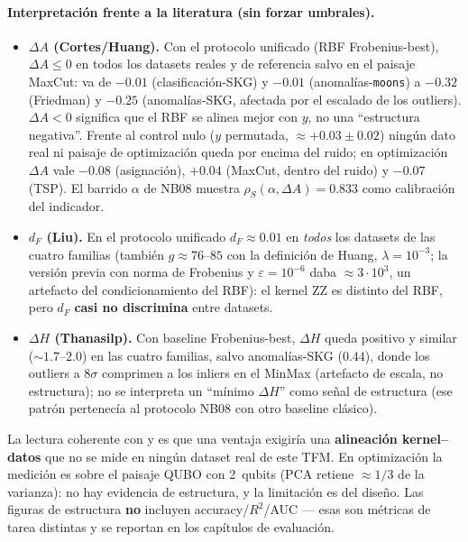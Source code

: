 \paragraph{Interpretación frente a la literatura (sin forzar umbrales).}
\begin{itemize}
    \item \textbf{$\Delta A$ (Cortes/Huang).} Con el protocolo unificado (RBF Frobenius-best), $\Delta A\le 0$ en todos los datasets reales y de referencia salvo en el paisaje MaxCut: va de $-0.01$ (clasificación-SKG) y $-0.01$ (anomalías-\texttt{moons}) a $-0.32$ (Friedman) y $-0.25$ (anomalías-SKG, afectada por el escalado de los outliers). $\Delta A<0$ significa que el RBF se alinea mejor con $y$, no una ``estructura negativa''. Frente al control nulo ($y$ permutada, $\approx+0.03\pm0.02$) ningún dato real ni paisaje de optimización queda por encima del ruido; en optimización $\Delta A$ vale $-0.08$ (asignación), $+0.04$ (MaxCut, dentro del ruido) y $-0.07$ (TSP). El barrido $\alpha$ de NB08 muestra $\rho_S(\alpha,\Delta A)=0.833$ como calibración del indicador.
    \item \textbf{$d_F$ (Liu).} En el protocolo unificado $d_F\approx 0.01$ en \emph{todos} los datasets de las cuatro familias (también $g\approx 76$--$85$ con la definición de Huang, $\lambda=10^{-3}$; la versión previa con norma de Frobenius y $\varepsilon=10^{-6}$ daba $\approx 3\cdot10^{3}$, un artefacto del condicionamiento del RBF): el kernel ZZ es distinto del RBF, pero $d_F$ \textbf{casi no discrimina} entre datasets.
    \item \textbf{$\Delta H$ (Thanasilp).} Con baseline Frobenius-best, $\Delta H$ queda positivo y similar ($\sim 1.7$--$2.0$) en las cuatro familias, salvo anomalías-SKG ($0.44$), donde los outliers a $8\sigma$ comprimen a los inliers en el MinMax (artefacto de escala, no estructura); no se interpreta un ``mínimo $\Delta H$'' como señal de estructura (ese patrón pertenecía al protocolo NB08 con otro baseline clásico).
\end{itemize}
La lectura coherente con \citet{liu2021} y \citet{huang2021} es que una ventaja exigiría una \textbf{alineación kernel--datos} que no se mide en ningún dataset real de este TFM. En optimización la medición es sobre el paisaje QUBO con 2~qubits (PCA retiene $\approx1/3$ de la varianza): no hay evidencia de estructura, y la limitación es del diseño. Las figuras de estructura \textbf{no} incluyen accuracy/$R^2$/AUC --- esas son métricas de tarea distintas y se reportan en los capítulos de evaluación.
